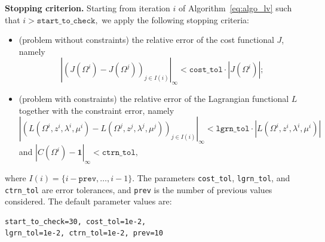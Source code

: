 \documentclass[preprint,9pt]{elsarticle}
\begin{document}
\vspace*{0.5cm}
\noindent \textbf{Stopping criterion.}
Starting from iteration $i$ of Algorithm~\ref{eq:algo_lv} such that
$
	i>\texttt{start\_to\_check},
$
we apply the following stopping criteria:
\begin{itemize}
	\item (problem without constraints) the relative error of
	the cost functional $J$, namely
	\[
		\left|(J(\Omega^i)-J(\Omega^j))_{j\in I(i)}\right|_{\infty}
		<\texttt{cost\_tol}\cdot |J(\Omega^i)|;
	\]
	\item (problem with constraints) the relative error of
	the Lagrangian functional $L$ together with the constraint error, namely
	\[
		\left|
		(
		L(\Omega^i, z^i, \lambda^i, \mu^i)-L(\Omega^j, z^j,\lambda^j,\mu^j)
		)_{j\in I(i)}
		\right|_\infty
		<\texttt{lgrn\_tol}\cdot|L(\Omega^i,z^i,\lambda^i,\mu^i)|
	\]
	and
	$
		|C(\Omega^i)-\textbf{1}|_\infty<\texttt{ctrn\_tol},
	$
\end{itemize}
where $I(i) = \{i-\texttt{prev}, \dots,i-1\}$.
The parameters \texttt{cost\_tol}, \texttt{lgrn\_tol}, and \texttt{ctrn\_tol} 
are error tolerances, and \texttt{prev} is
the number of previous values considered.
The default parameter values are:
\begin{lstlisting}
start_to_check=30, cost_tol=1e-2,
lgrn_tol=1e-2, ctrn_tol=1e-2, prev=10
\end{lstlisting}
\end{document}
